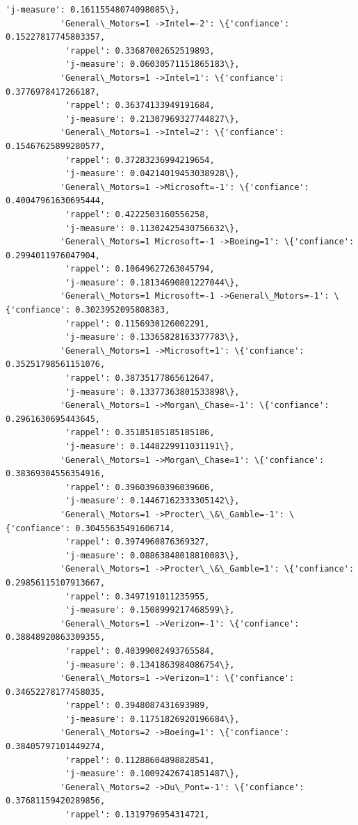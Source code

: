 \documentclass[11pt]{article}
\begin{document}
\begin{Verbatim}[commandchars=\\\{\}]
            'j-measure': 0.16115548074098085\},
           'General\_Motors=1 ->Intel=-2': \{'confiance': 0.15227817745803357,
            'rappel': 0.33687002652519893,
            'j-measure': 0.06030571151865183\},
           'General\_Motors=1 ->Intel=1': \{'confiance': 0.3776978417266187,
            'rappel': 0.36374133949191684,
            'j-measure': 0.21307969327744827\},
           'General\_Motors=1 ->Intel=2': \{'confiance': 0.15467625899280577,
            'rappel': 0.37283236994219654,
            'j-measure': 0.04214019453038928\},
           'General\_Motors=1 ->Microsoft=-1': \{'confiance': 0.40047961630695444,
            'rappel': 0.4222503160556258,
            'j-measure': 0.11302425430756632\},
           'General\_Motors=1 Microsoft=-1 ->Boeing=1': \{'confiance': 0.2994011976047904,
            'rappel': 0.10649627263045794,
            'j-measure': 0.18134690801227044\},
           'General\_Motors=1 Microsoft=-1 ->General\_Motors=-1': \{'confiance': 0.3023952095808383,
            'rappel': 0.1156930126002291,
            'j-measure': 0.13365828163377783\},
           'General\_Motors=1 ->Microsoft=1': \{'confiance': 0.35251798561151076,
            'rappel': 0.38735177865612647,
            'j-measure': 0.13377363801533898\},
           'General\_Motors=1 ->Morgan\_Chase=-1': \{'confiance': 0.2961630695443645,
            'rappel': 0.35185185185185186,
            'j-measure': 0.1448229911031191\},
           'General\_Motors=1 ->Morgan\_Chase=1': \{'confiance': 0.38369304556354916,
            'rappel': 0.39603960396039606,
            'j-measure': 0.14467162333305142\},
           'General\_Motors=1 ->Procter\_\&\_Gamble=-1': \{'confiance': 0.30455635491606714,
            'rappel': 0.3974960876369327,
            'j-measure': 0.08863848018810083\},
           'General\_Motors=1 ->Procter\_\&\_Gamble=1': \{'confiance': 0.29856115107913667,
            'rappel': 0.3497191011235955,
            'j-measure': 0.1508999217468599\},
           'General\_Motors=1 ->Verizon=-1': \{'confiance': 0.38848920863309355,
            'rappel': 0.40399002493765584,
            'j-measure': 0.1341863984086754\},
           'General\_Motors=1 ->Verizon=1': \{'confiance': 0.34652278177458035,
            'rappel': 0.3948087431693989,
            'j-measure': 0.11751826920196684\},
           'General\_Motors=2 ->Boeing=1': \{'confiance': 0.38405797101449274,
            'rappel': 0.11288604898828541,
            'j-measure': 0.10092426741851487\},
           'General\_Motors=2 ->Du\_Pont=-1': \{'confiance': 0.37681159420289856,
            'rappel': 0.1319796954314721,

\end{Verbatim}
\end{document}
